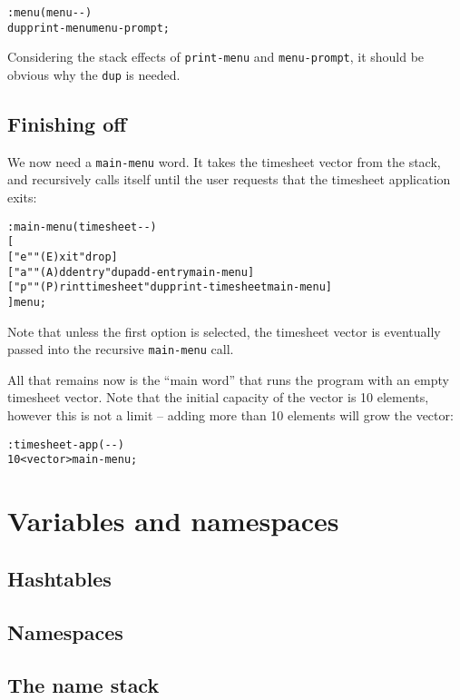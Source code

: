 \documentclass[english]{article}
\begin{document}
\begin{alltt}
: menu ( menu -{}- )
    dup print-menu menu-prompt ;
\end{alltt}

Considering the stack effects of \texttt{print-menu} and \texttt{menu-prompt}, it should be obvious why the \texttt{dup} is needed.

\subsection{Finishing off}

We now need a \texttt{main-menu} word. It takes the timesheet vector from the stack, and recursively calls itself until the user requests that the timesheet application exits:

\begin{alltt}
: main-menu ( timesheet -{}- )
    {[}
        {[} "e" "(E)xit" drop {]}
        {[} "a" "(A)dd entry" dup add-entry main-menu {]}
        {[} "p" "(P)rint timesheet" dup print-timesheet main-menu {]}
    {]} menu ;
\end{alltt}

Note that unless the first option is selected, the timesheet vector is eventually passed into the recursive \texttt{main-menu} call.

All that remains now is the ``main word'' that runs the program with an empty timesheet vector. Note that the initial capacity of the vector is 10 elements, however this is not a limit -- adding more than 10 elements will grow the vector:

\begin{alltt}
: timesheet-app ( -{}- )
    10 <vector> main-menu ;
\end{alltt}

\section{Variables and namespaces}


\subsection{Hashtables}


\subsection{Namespaces}


\subsection{The name stack}
\end{document}
